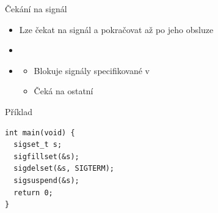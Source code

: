 \begin{frame}[fragile]{Čekání na signál}

  \begin{itemize}
    \item Lze čekat na signál a pokračovat až po jeho obsluze

    \pause

    \item {}

    \pause

    \item {}
    \begin{itemize}
      \item Blokuje signály specifikované v 
      \item Čeká na ostatní
    \end{itemize}

  \end{itemize}

  \begin{block}{Příklad}
    \begin{lstlisting}[columns=fullflexible]
int main(void) {
  sigset_t s;
  sigfillset(&s);
  sigdelset(&s, SIGTERM);
  sigsuspend(&s);
  return 0;
}
    \end{lstlisting}
  \end{block}

\end{frame}

\fi

